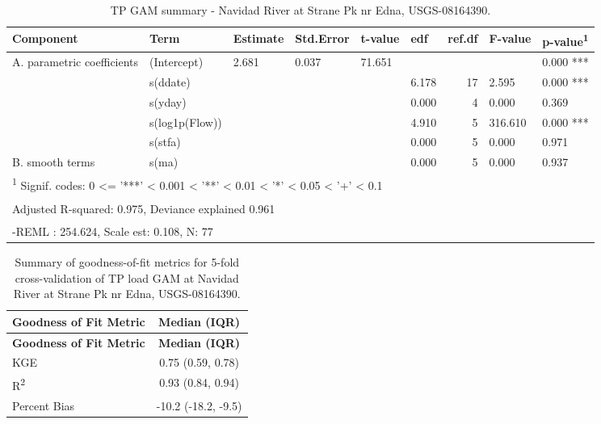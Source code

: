 \documentclass[
]{article}
\newenvironment{widestuff}{\begin{table}[h]\begin{adjustwidth}{-4.5cm}{-4.5cm}\centering}{\end{adjustwidth}\end{table}}
\begin{document}
\begin{widestuff}

\caption{TP GAM summary - Navidad River at Strane Pk nr Edna, USGS-08164390.}
\centering
\begin{tabular}[t]{llllllrll}
\toprule
Component & Term & Estimate & Std.Error & t-value & edf & ref.df & F-value & p-value\textsuperscript{1}\\
\midrule
A. parametric coefficients & (Intercept) & 2.681 & 0.037 & 71.651 &  &  &  & 0.000 ***\\
\cmidrule{1-9}
 & s(ddate) &  &  &  & 6.178 & 17 & 2.595 & 0.000 ***\\

 & s(yday) &  &  &  & 0.000 & 4 & 0.000 & 0.369\\

 & s(log1p(Flow)) &  &  &  & 4.910 & 5 & 316.610 & 0.000 ***\\

 & s(stfa) &  &  &  & 0.000 & 5 & 0.000 & 0.971\\

\multirow[t]{-5}{*}{\raggedright\arraybackslash B. smooth terms} & s(ma) &  &  &  & 0.000 & 5 & 0.000 & 0.937\\
\bottomrule
\multicolumn{9}{l}{\textsuperscript{1} Signif. codes: 0 <= '***' < 0.001 < '**' < 0.01 < '*' < 0.05 < '+' < 0.1}\\
\multicolumn{9}{l}{\textsuperscript{} Adjusted R-squared: 0.975, Deviance explained 0.961}\\
\multicolumn{9}{l}{\textsuperscript{} -REML : 254.624, Scale est: 0.108, N: 77}\\
\end{tabular}
\end{widestuff}

\hypertarget{tbl-TP08164390-CV}{}
\begin{longtable}[]{@{}lc@{}}
\caption{\label{tbl-TP08164390-CV}Summary of goodness-of-fit metrics for
5-fold cross-validation of TP load GAM at Navidad River at Strane Pk nr
Edna, USGS-08164390.}\tabularnewline
\toprule()
\textbf{Goodness of Fit Metric} & \textbf{Median (IQR)} \\
\midrule()
\endfirsthead
\toprule()
\textbf{Goodness of Fit Metric} & \textbf{Median (IQR)} \\
\midrule()
\endhead
KGE & 0.75 (0.59, 0.78) \\
R\textsuperscript{2} & 0.93 (0.84, 0.94) \\
Percent Bias & -10.2 (-18.2, -9.5) \\
\bottomrule()
\end{longtable}
\end{document}
